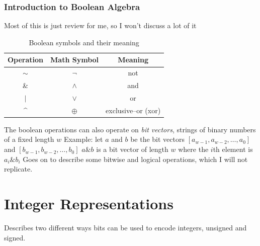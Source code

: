 \documentclass[../bryant_comp_sys.tex]{subfiles}
\begin{document}
            \subsubsection{Introduction to Boolean Algebra}
                \begin{outline}
                    \1 Most of this is just review for me, so I won't discuss a lot of it 

                    \begin{table}[h!]
                        \centering
                        \begin{tabular} {ccc}
                            Operation           & Math Symbol   & Meaning               \\ \hline
                            \(\sim\)            & \(\neg\)      & not                   \\
                            \&                  & \(\land\)     & and                   \\
                            \(\mid\)            & \(\lor\)      & or                    \\
                            \textasciicircum    & \(\oplus\)    & exclusive--or (xor)
                        \end{tabular}
                        \label{tab:boolsymbols}
                        \caption{Boolean symbols and their meaning}
                    \end{table}

                    \1 The boolean operations can also operate on \textit{bit vectors}, strings of binary numbers of a fixed length \(w\)
                        \2 Example: let \(a\) and \(b\) be the bit vectors \(\left[ a_{w-1}, a_{w-2}, \ldots, a_0 \right]\) and \(\left[ b_{w-1}, b_{w-2}, \ldots, b_0 \right]\)
                        \2 \(a \& b\) is a bit vector of length \(w\) where the \(i\)th element is \(a_i \& b_i\)
                    \1 Goes on to describe some bitwise and logical operations, which I will not replicate.
                \end{outline}

        \section{Integer Representations}
            \begin{outline}
                \1 Describes two different ways bits can be used to encode integers, unsigned and signed.
            \end{outline}
\end{document}
